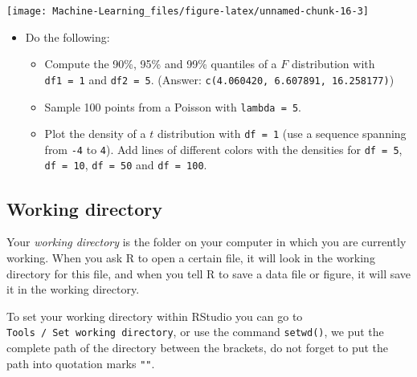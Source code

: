 \documentclass[]{book}
\newenvironment{Shaded}{\begin{snugshade}}{\end{snugshade}}
\newcommand{\KeywordTok}[1]{\textcolor[rgb]{0.13,0.29,0.53}{\textbf{{#1}}}}
\newcommand{\DataTypeTok}[1]{\textcolor[rgb]{0.13,0.29,0.53}{{#1}}}
\newcommand{\DecValTok}[1]{\textcolor[rgb]{0.00,0.00,0.81}{{#1}}}
\newcommand{\FloatTok}[1]{\textcolor[rgb]{0.00,0.00,0.81}{{#1}}}
\newcommand{\CommentTok}[1]{\textcolor[rgb]{0.56,0.35,0.01}{\textit{{#1}}}}
\newcommand{\NormalTok}[1]{{#1}}
\providecommand{\tightlist}{%
  \setlength{\itemsep}{0pt}\setlength{\parskip}{0pt}}
\newenvironment{rmdblock}[1]
  {\begin{shaded*}
  \begin{itemize}
  \renewcommand{\labelitemi}{
    \raisebox{-.7\height}[0pt][0pt]{
      {\setkeys{Gin}{width=2em,keepaspectratio}\texttt{[image: img/icons/\#1]}}
    }
  }
  \item
  }
  {
  \end{itemize}
  \end{shaded*}
  }
\newenvironment{rmdexercise}
  {\begin{rmdblock}{exercise}}
  {\end{rmdblock}}
\begin{document}
\begin{center}\texttt{[image: Machine-Learning\_files/figure-latex/unnamed-chunk-16-3]} \end{center}

\begin{Shaded}
\end{Shaded}

\begin{rmdexercise}
Do the following:

\begin{itemize}
\tightlist
\item
  Compute the 90\%, 95\% and 99\% quantiles of a \(F\) distribution with
  \texttt{df1\ =\ 1} and \texttt{df2\ =\ 5}. (Answer:
  \texttt{c(4.060420,\ 6.607891,\ 16.258177)})
\item
  Sample 100 points from a Poisson with \texttt{lambda\ =\ 5}.
\item
  Plot the density of a \(t\) distribution with \texttt{df\ =\ 1} (use a
  sequence spanning from \texttt{-4} to \texttt{4}). Add lines of
  different colors with the densities for \texttt{df\ =\ 5},
  \texttt{df\ =\ 10}, \texttt{df\ =\ 50} and \texttt{df\ =\ 100}.
\end{itemize}
\end{rmdexercise}

\subsection{Working directory}\label{working-directory}

Your \emph{working directory} is the folder on your computer in which
you are currently working. When you ask R to open a certain file, it
will look in the working directory for this file, and when you tell R to
save a data file or figure, it will save it in the working directory.

To set your working directory within RStudio you can go to
\texttt{Tools\ /\ Set\ working\ directory}, or use the command
\texttt{setwd()}, we put the complete path of the directory between the
brackets, do not forget to put the path into quotation marks
\texttt{""}.
\end{document}
